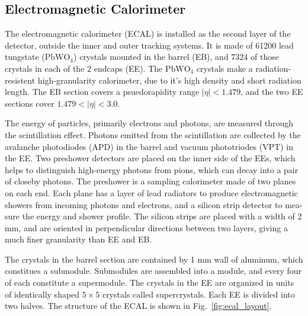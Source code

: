 \subsection{Electromagnetic Calorimeter}

The electromagnetic calorimeter (ECAL) is installed as the second layer of the detector, outside the inner and outer tracking systems. It is made of
61200 lead tungstate ($\textrm{PbWO}_{4}$) crystals mounted in the barrel (EB), and 7324 of those crystals in each of the 2 endcaps (EE). 
The $\textrm{PbWO}_{4}$ crystals make
a radiation-resistent high-granularity calorimeter, due to it's high density and short radiation length. The EB section covers a psuedorapidity range
$|\eta| < 1.479$, and the two EE sections cover $1.479 < |\eta| < 3.0$.

The energy of particles, primarily electrons and photons, are measured through the scintillation effect. Photons emitted from the scintillation are 
collected by the avalanche photodiodes (APD) in the barrel and vacuum phototriodes (VPT) in the EE. Two preshower detectors are placed on the inner side
of the EEs, which helps to distinguish high-energy photons from pions, which can decay into a pair of closeby photons. The preshower is a sampling 
calorimeter made of two planes on each end. Each plane has a layer of lead radiators to produce electromagnetic showers from incoming photons and electrons, 
and a silicon strip detector to mea- sure the energy and shower profile. The silicon strips are placed with a width of 2 mm, and are oriented in perpendicular 
directions between two layers, giving a much finer granularity than EE and EB. 

The crystals in the barrel section are contained by 1 mm wall of aluminum, which constitues a submodule. Submodules are assembled into a module, 
and every four of each constitute a supermodule. The crystals in the EE are organized in units of identically shaped $5 \times 5$ crystals called supercrystals. 
Each EE is divided into two halves. The structure of the ECAL is shown in Fig.~\ref{fig:ecal_layout}.

